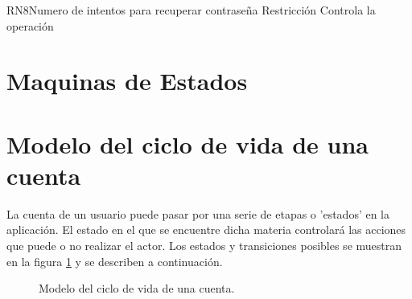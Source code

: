 \begin{BusinessRule}{RN8}{Numero de intentos para recuperar contraseña}
	{Restricción}
	{Controla la operación}
\end{BusinessRule}







\newpage
\section{Maquinas de Estados}

\hypertarget{cv:Cuenta}{\section{Modelo del ciclo de vida de una cuenta}}

La cuenta de un usuario puede pasar por una serie de etapas o 'estados' en la aplicación. El estado en el que se encuentre dicha materia controlará las acciones que puede o no realizar el actor. Los estados y transiciones posibles se muestran en la figura \ref{fig:maq:cuenta} y se describen a continuación.\\

\begin{figure}[htbp!]
	\centering
	\caption{Modelo del ciclo de vida de una cuenta.}
	\label{fig:maq:cuenta}
\end{figure}

